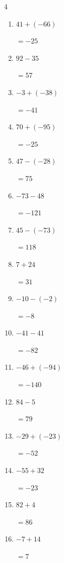 \begin{multicols}{4}
\begin{enumerate}
        $=-22$

  \item $41+(-66)$

        $=-25$

\columnbreak %

\resetques

  \item $92-35$

        $=57$

  \item $-3+(-38)$

        $=-41$

  \item $70+(-95)$

        $=-25$

  \item $47-(-28)$

        $=75$

  \item $-73-48$

        $=-121$

  \item $45-(-73)$

        $=118$

  \item $7+24$

        $=31$

  \item $-10-(-2)$

        $=-8$

  \item $-41-41$

        $=-82$

  \item $-46+(-94)$

        $=-140$

  \item $84-5$

        $=79$

  \item $-29+(-23)$

        $=-52$

  \item $-55+32$

        $=-23$

  \item $82+4$

        $=86$

  \item $-7+14$

        $=7$


\end{enumerate}
\end{multicols}
